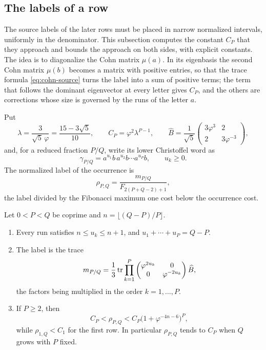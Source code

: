 \subsection{The labels of a row}\label{sec:row-labels}

The source labels of the later rows must be placed in narrow normalized
intervals, uniformly in the denominator. This subsection computes the
constant $C_P$ that they approach and bounds the approach on both sides,
with explicit constants. The idea is to diagonalize the Cohn matrix
$\mu(a)$. In its eigenbasis the second Cohn matrix $\mu(b)$ becomes a
matrix with positive entries, so that the trace formula
\eqref{eq:cohn-source} turns the label into a sum of positive terms; the
term that follows the dominant eigenvector at every letter gives $C_P$,
and the others are corrections whose size is governed by the runs of the
letter $a$.

Put
$$
 \lambda=\frac3{\sqrt5\,\varphi}=\frac{15-3\sqrt5}{10},\qquad
 C_P=\varphi^2\lambda^{P-1},\qquad
 \widehat B=\frac1{\sqrt5}\begin{pmatrix}3\varphi^3&2\\2&3\varphi^{-3}\end{pmatrix},
$$
and, for a reduced fraction $P/Q$, write its lower Christoffel word as
$$
 \gamma_{P/Q}=a^{u_1}b\,a^{u_2}b\cdots a^{u_P}b,\qquad u_k\geqslant0 .
$$
The normalized label of the occurrence is
\begin{equation}\label{eq:row-ratio}
 \rho_{P,Q}=\frac{m_{P/Q}}{F_{2(P+Q-2)+1}} ,
\end{equation}
the label divided by the Fibonacci maximum one cost below the occurrence
cost.

\begin{proposition}\label{prop:row-labels}
Let $0<P<Q$ be coprime and $n=\lfloor(Q-P)/P\rfloor$.
\begin{enumerate}[label=\textup{(\roman*)},ref=\textup{(\roman*)},leftmargin=*]
\item\label{it:row-runs} Every run satisfies $n\leqslant u_k\leqslant n+1$, and $u_1+\cdots+u_P=Q-P$.
\item\label{it:row-trace} The label is the trace
 $$
 m_{P/Q}=\frac13\operatorname{tr}\prod_{k=1}^{P}
 \begin{pmatrix}\varphi^{2u_k}&0\\0&\varphi^{-2u_k}\end{pmatrix}\widehat B ,
 $$
 the factors being multiplied in the order $k=1,\dots,P$.
\item\label{it:row-bounds} If $P\geqslant2$, then
 \begin{equation}\label{eq:row-source-limit}
 C_P<\rho_{P,Q}<C_P\bigl(1+\varphi^{-4n-6}\bigr)^P ,
 \end{equation}
 while $\rho_{1,Q}<C_1$ for the first row. In particular
 $\rho_{P,Q}$ tends to $C_P$ when $Q$ grows with $P$ fixed.
\end{enumerate}
\end{proposition}

